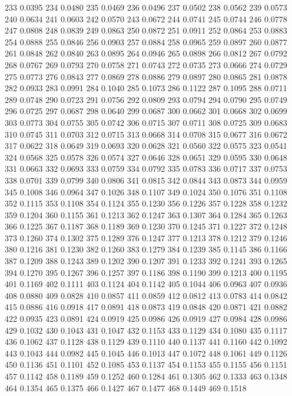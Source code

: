 233 0.0395
234 0.0480
235 0.0469
236 0.0496
237 0.0502
238 0.0562
239 0.0573
240 0.0634
241 0.0603
242 0.0570
243 0.0672
244 0.0741
245 0.0744
246 0.0778
247 0.0808
248 0.0839
249 0.0863
250 0.0872
251 0.0911
252 0.0864
253 0.0883
254 0.0888
255 0.0846
256 0.0903
257 0.0884
258 0.0965
259 0.0897
260 0.0877
261 0.0848
262 0.0840
263 0.0895
264 0.0946
265 0.0898
266 0.0812
267 0.0792
268 0.0767
269 0.0793
270 0.0758
271 0.0743
272 0.0735
273 0.0666
274 0.0729
275 0.0773
276 0.0843
277 0.0869
278 0.0886
279 0.0897
280 0.0865
281 0.0878
282 0.0933
283 0.0991
284 0.1040
285 0.1073
286 0.1122
287 0.1095
288 0.0711
289 0.0748
290 0.0723
291 0.0756
292 0.0809
293 0.0794
294 0.0790
295 0.0749
296 0.0725
297 0.0687
298 0.0640
299 0.0687
300 0.0662
301 0.0668
302 0.0699
303 0.0773
304 0.0755
305 0.0742
306 0.0715
307 0.0711
308 0.0725
309 0.0683
310 0.0745
311 0.0703
312 0.0715
313 0.0668
314 0.0708
315 0.0677
316 0.0672
317 0.0622
318 0.0649
319 0.0693
320 0.0628
321 0.0560
322 0.0575
323 0.0541
324 0.0568
325 0.0578
326 0.0574
327 0.0646
328 0.0651
329 0.0595
330 0.0648
331 0.0663
332 0.0693
333 0.0759
334 0.0792
335 0.0783
336 0.0717
337 0.0753
338 0.0701
339 0.0799
340 0.0806
341 0.0815
342 0.0844
343 0.0873
344 0.0959
345 0.1008
346 0.0964
347 0.1026
348 0.1107
349 0.1024
350 0.1076
351 0.1108
352 0.1115
353 0.1108
354 0.1124
355 0.1230
356 0.1226
357 0.1228
358 0.1232
359 0.1204
360 0.1155
361 0.1213
362 0.1247
363 0.1307
364 0.1284
365 0.1263
366 0.1225
367 0.1187
368 0.1189
369 0.1230
370 0.1245
371 0.1227
372 0.1248
373 0.1260
374 0.1302
375 0.1289
376 0.1247
377 0.1213
378 0.1212
379 0.1246
380 0.1216
381 0.1230
382 0.1260
383 0.1279
384 0.1239
385 0.1145
386 0.1166
387 0.1209
388 0.1243
389 0.1202
390 0.1207
391 0.1233
392 0.1241
393 0.1265
394 0.1270
395 0.1267
396 0.1257
397 0.1186
398 0.1190
399 0.1213
400 0.1195
401 0.1169
402 0.1111
403 0.1124
404 0.1142
405 0.1044
406 0.0963
407 0.0936
408 0.0880
409 0.0828
410 0.0857
411 0.0859
412 0.0812
413 0.0783
414 0.0842
415 0.0886
416 0.0918
417 0.0891
418 0.0873
419 0.0848
420 0.0871
421 0.0882
422 0.0935
423 0.0891
424 0.0919
425 0.0986
426 0.0919
427 0.0984
428 0.0986
429 0.1032
430 0.1043
431 0.1047
432 0.1153
433 0.1129
434 0.1080
435 0.1117
436 0.1062
437 0.1128
438 0.1129
439 0.1110
440 0.1137
441 0.1160
442 0.1092
443 0.1043
444 0.0982
445 0.1045
446 0.1013
447 0.1072
448 0.1061
449 0.1126
450 0.1136
451 0.1101
452 0.1085
453 0.1137
454 0.1153
455 0.1155
456 0.1151
457 0.1142
458 0.1189
459 0.1252
460 0.1284
461 0.1305
462 0.1333
463 0.1348
464 0.1354
465 0.1375
466 0.1427
467 0.1477
468 0.1449
469 0.1518
